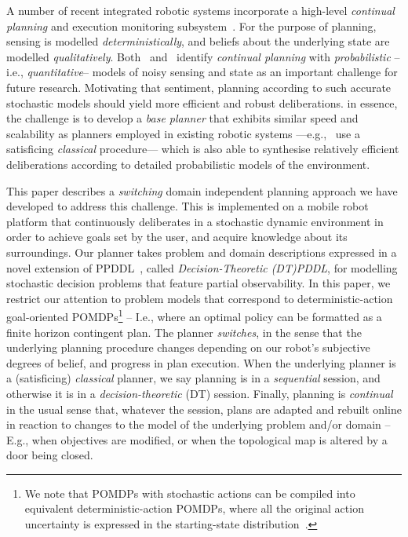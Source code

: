 



A number of recent integrated robotic systems incorporate a
high-level {\em continual planning} and execution monitoring
subsystem~\cite{wyattetal2010tamd,talamadupula:2010,Kraft2008}.
For the purpose of planning, sensing is modelled {\em
deterministically}, and beliefs about the underlying state are
modelled {\em qualitatively}.
Both~\citeauthor{talamadupula:2010} and~\citeauthor{wyattetal2010tamd}
identify
\emph{continual planning} with {\em probabilistic} --i.e., {\em quantitative}--
models of noisy sensing and state as an important challenge for future
research.
Motivating that sentiment, planning according to such accurate
stochastic models should yield more efficient and robust
deliberations.
in essence, the challenge is to develop a {\em base planner} that
exhibits similar speed and scalability as planners employed in
existing robotic systems ---e.g.,~\citeauthor{wyattetal2010tamd} use a
satisficing {\em classical} procedure--- which is also able to
synthesise relatively efficient deliberations according to detailed
probabilistic models of the environment.


This paper describes a {\em switching} domain independent planning
approach we have developed to address this challenge. This is
implemented on a mobile robot platform that continuously deliberates
in a stochastic dynamic environment in order to achieve goals set by
the user, and acquire knowledge about its surroundings.
Our planner takes problem and domain descriptions expressed in a novel
extension of PPDDL~\cite{younes:etal:2005}, called {\em
Decision-Theoretic (DT)PDDL}, for modelling stochastic decision
problems that feature partial observability.  In this paper, we
restrict our attention to problem models that correspond to
deterministic-action goal-oriented POMDPs\footnote{We note that POMDPs
with stochastic actions can be compiled into equivalent
deterministic-action POMDPs, where all the original action uncertainty
is expressed in the starting-state
distribution~\cite{ng:Jordan:2000}.} -- I.e., where an optimal policy
can be formatted as a finite horizon contingent plan.  The planner
{\em switches}, in the sense that the underlying planning procedure
changes depending on our robot's subjective degrees of belief, and
progress in plan execution. When the underlying planner is a
(satisficing) {\em classical} planner, we say planning is in a {\em
sequential} session, and otherwise it is in a {\em decision-theoretic}
(DT) session. Finally, planning is {\em continual} in the usual sense
that, whatever the session, plans are adapted and rebuilt online in
reaction to changes to the model of the underlying problem and/or
domain -- E.g., when objectives are modified, or when the topological
map is altered by a door being closed.


